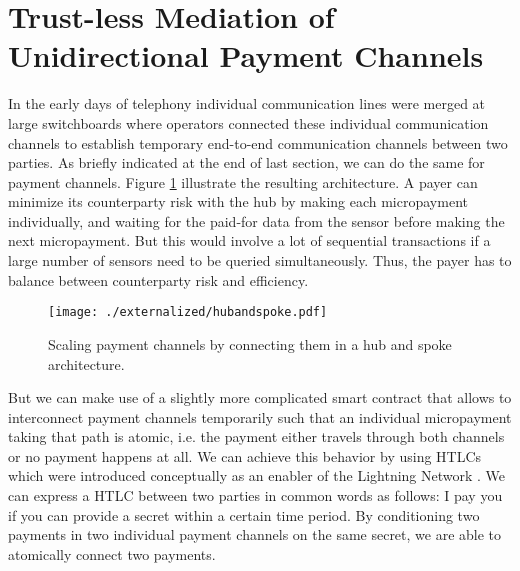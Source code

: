 \section{Trust-less Mediation of Unidirectional Payment Channels}
\label{sec:htlc}

In the early days of telephony individual communication lines were merged at large switchboards where operators connected these individual communication channels to establish temporary end-to-end communication channels between two parties. As briefly indicated at the end of last section, we can do the same for payment channels. Figure \ref{fig:hubandspoke} illustrate the resulting architecture. A payer can minimize its counterparty risk with the hub by making each micropayment individually, and waiting for the paid-for data from the sensor before making the next micropayment. But this would involve a lot of sequential transactions if a large number of sensors need to be queried simultaneously. Thus, the payer has to balance between counterparty risk and efficiency. 

\begin{figure}
\centering
\texttt{[image: ./externalized/hubandspoke.pdf]}
\caption{Scaling payment channels by connecting them in a hub and spoke architecture.}
\label{fig:hubandspoke}
\end{figure}

But we can make use of a slightly more complicated smart contract that allows to interconnect payment channels temporarily such that an individual micropayment taking that path is atomic, i.e. the payment either travels through both channels or no payment happens at all. We can achieve this behavior by using \ac{HTLC}s which were introduced conceptually as an enabler of the Lightning Network \parencite{poonbitcoin}. We can express a \ac{HTLC} between two parties in common words as follows: I pay you if you can provide a secret within a certain time period. By conditioning two payments in two individual payment channels on the same secret, we are able to atomically connect two payments. 


